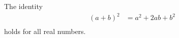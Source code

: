 \documentclass{article}
\begin{document}
The identity
\begin{align*}
  (a+b)^2 &= a^2 + 2ab + b^2 \\
\end{align*}
holds for all real numbers.
\end{document}
